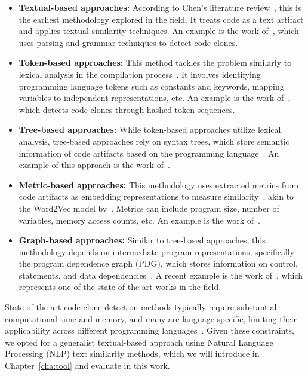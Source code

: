 \begin{itemize}
    \item \textbf{Textual-based approaches:} According to Chen’s literature 
    review~\citep{litreview}, this is the earliest methodology explored in 
    the field. It treats code as a text artifact and applies textual similarity
    techniques. An example is the work of~\cite{textexample}, 
    which uses parsing and grammar techniques to detect code clones.

    \item \textbf{Token-based approaches:} This method tackles the problem 
    similarly to lexical analysis in the compilation process~\citep{litreview}. 
    It involves identifying programming language tokens such as constants and 
    keywords, mapping variables to independent representations, etc. An example
    is the work of~\cite{tokenexample}, which detects code 
    clones through hashed token sequences.

    \item \textbf{Tree-based approaches:} While token-based approaches utilize
     lexical analysis, tree-based approaches rely on syntax trees, which store
     semantic information of code artifacts based on the programming
     language~\citep{compiler}. An example of this approach is the work of~\cite{treeexample}.

    \item \textbf{Metric-based approaches:} This methodology uses extracted 
    metrics from code artifacts as embedding representations to measure 
    similarity~\citep{litreview}, akin to the Word2Vec model by~\cite{wordtovec}.
    Metrics can include program size, number of variables, 
    memory access counts, etc. An example is the work of~\cite{metricexample}.

    \item \textbf{Graph-based approaches:} Similar to tree-based approaches, 
    this methodology depends on intermediate program representations, 
    specifically the program dependence graph (PDG), which stores information 
    on control, statements, and data dependencies~\citep{prodg}. A recent 
    example is the work of~\cite{tailor}, which represents one of 
    the state-of-the-art works in the field.
\end{itemize}

State-of-the-art code clone detection methods typically require substantial
computational time and memory, and many are language-specific, limiting their
applicability across different programming languages~\citep{litreview}. Given
these constraints, we opted for a generalist textual-based approach using
Natural Language Processing (NLP) text similarity methods, which we will
introduce in Chapter~\ref{cha:tool} and evaluate in this work.

